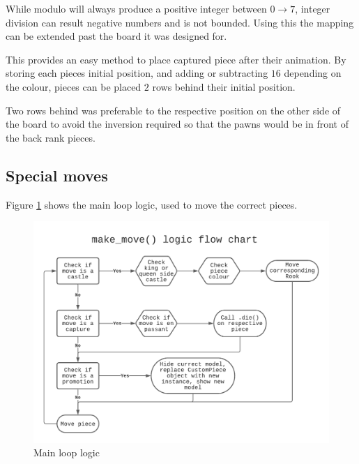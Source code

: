 \documentclass[11pt]{article}
\begin{document}
While modulo will always produce a positive integer between \(0 \to 7\), integer
division can result negative numbers and is not bounded. Using this the mapping
can be extended past the board it was designed for.

This provides an easy method to place captured piece after their animation. By
storing each pieces initial position, and adding or subtracting \(16\) depending on
the colour, pieces can be placed \(2\) rows behind their initial position.

Two rows behind was preferable to the respective position on the other side of
the board to avoid the inversion required so that the pawns would be in front of the
back rank pieces.

\newpage
\subsection{Special moves}
\label{sec:orgdb959ac}
Figure \ref{flowchart} shows the main loop logic, used to move the correct pieces.
\begin{figure}[htbp]
\centering
\includegraphics[width=\textwidth]{flowchart.pdf}
\caption{\label{flowchart}Main loop logic}
\end{figure}
\end{document}
